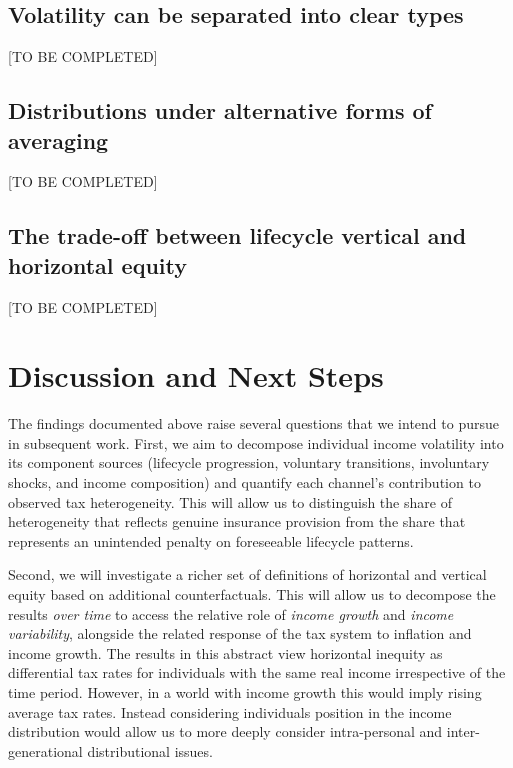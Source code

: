 \documentclass[12pt,a4paper]{article}
\begin{document}
\newpage
\subsection{Volatility can be separated into clear types}

[TO BE COMPLETED]

\subsection{Distributions under alternative forms of averaging}

[TO BE COMPLETED]

\subsection{The trade-off between lifecycle vertical and horizontal equity}

[TO BE COMPLETED]

\section{Discussion and Next Steps}

The findings documented above raise several questions that we intend to pursue in subsequent work. First, we aim to decompose individual income volatility into its component sources (lifecycle progression, voluntary transitions, involuntary shocks, and income composition) and quantify each channel's contribution to observed tax heterogeneity. This will allow us to distinguish the share of heterogeneity that reflects genuine insurance provision from the share that represents an unintended penalty on foreseeable lifecycle patterns.

Second, we will investigate a richer set of definitions of horizontal and vertical equity based on additional counterfactuals. This will allow us to decompose the results \emph{over time} to access the relative role of \emph{income growth} and \emph{income variability}, alongside the related response of the tax system to inflation and income growth. The results in this abstract view horizontal inequity as differential tax rates for individuals with the same real income irrespective of the time period. However, in a world with income growth this would imply rising average tax rates. Instead considering individuals position in the income distribution would allow us to more deeply consider intra-personal and inter-generational distributional issues.
\end{document}
